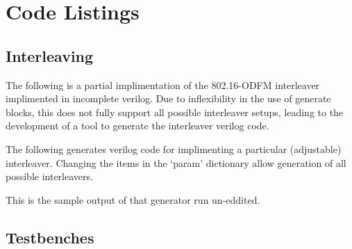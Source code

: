 \section{Code Listings}













\subsection{Interleaving}

The following is a partial implimentation of the 802.16-ODFM interleaver implimented in incomplete verilog. Due to inflexibility in the use of generate blocks, this does not fully support all possible interleaver setups, leading to the development of a tool to generate the interleaver verilog code.


The following generates verilog code for implimenting a particular (adjustable) interleaver. Changing the items in the `param' dictionary allow generation of all possible interleavers.


This is the sample output of that generator run un-eddited.



\subsection{Testbenches}




